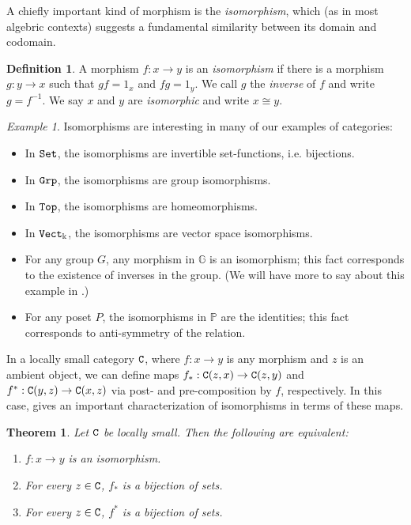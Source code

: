 \documentclass[11 pt]{amsart}
\theoremstyle{plain}   %
\newtheorem{thm}{Theorem}[section] %
\theoremstyle{definition}
\newtheorem{defn}{Definition}[section]
\theoremstyle{remark}
\newtheorem{ex}{Example}[section]
\numberwithin{equation}{section}
\def\GG{\mathbb{G}}
\def\PP{\mathbb{P}}
\newcommand{\cat}[1]{{\normalfont\texttt{#1}}}
\begin{document}
A chiefly important kind of morphism is the \emph{isomorphism}, which (as in
most algebric contexts) suggests a fundamental similarity between its domain and
codomain.

\begin{defn}
	A morphism $f: x\rightarrow y$ is an \emph{isomorphism} if there is a morphism
	$g: y\rightarrow x$ such that $gf = 1_x$ and $fg = 1_y$. We call $g$ the
	\emph{inverse} of $f$ and write $g = f^{-1}$. We say $x$ and $y$ are
	\emph{isomorphic} and write $x\cong y$.
\end{defn}

\begin{ex}\label{isomorphisms} Isomorphisms are interesting in many of our examples of categories:
	\begin{itemize}
		\item In $\cat{Set}$, the isomorphisms are invertible set-functions, i.e. bijections.
		\item In $\cat{Grp}$, the isomorphisms are group isomorphisms.
		\item In $\cat{Top}$, the isomorphisms are homeomorphisms.
		\item In $\cat{Vect}_{\Bbbk}$, the isomorphisms are vector space isomorphisms.
		\item For any group $G$, any morphism in $\GG$ is an isomorphism;
		      this fact corresponds to the existence of inverses in the group. (We
		      will have more to say about this example in .)
		\item For any poset $P$, the isomorphisms in $\PP$ are the identities;
		      this fact corresponds to anti-symmetry of the relation.
	\end{itemize}
\end{ex}

In a locally small category $\cat{C}$, where $f: x\rightarrow y$ is any morphism
and $z$ is an ambient object, we can define maps $f_*: \cat{C}(z, x)\rightarrow
	\cat{C}(z, y)$ and $f^*: \cat{C}(y, z)\rightarrow \cat{C}(x, z)$ via post- and
pre-composition by $f$, respectively. In this case,  gives an important characterization of isomorphisms in terms
of these maps.

\begin{thm}\label{isomorphism characterization}Let $\cat{C}$ be locally small.
	Then the following are equivalent:

	\begin{enumerate}
		\item  $f: x\rightarrow y$ is an isomorphism.
		\item  For every $z\in\cat{C}$, $f_*$ is a bijection of sets.
		\item For every $z\in\cat{C}$, $f^*$ is a bijection of sets.
	\end{enumerate}
\end{thm}
\end{document}
